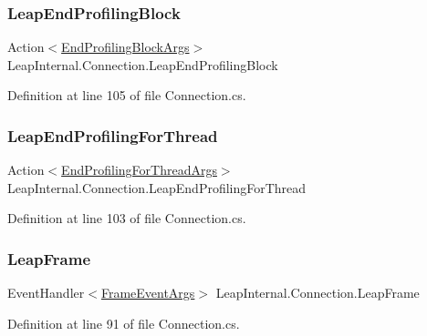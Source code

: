 \subsubsection{\texorpdfstring{LeapEndProfilingBlock}{LeapEndProfilingBlock}}
{\footnotesize\ttfamily Action$<$\mbox{\hyperlink{struct_leap_1_1_end_profiling_block_args}{End\+Profiling\+Block\+Args}}$>$ Leap\+Internal.\+Connection.\+Leap\+End\+Profiling\+Block}



Definition at line 105 of file Connection.\+cs.

\mbox{\label{class_leap_internal_1_1_connection_a424896b5a35580707284fa570e40138a}} 
\subsubsection{\texorpdfstring{LeapEndProfilingForThread}{LeapEndProfilingForThread}}
{\footnotesize\ttfamily Action$<$\mbox{\hyperlink{struct_leap_1_1_end_profiling_for_thread_args}{End\+Profiling\+For\+Thread\+Args}}$>$ Leap\+Internal.\+Connection.\+Leap\+End\+Profiling\+For\+Thread}



Definition at line 103 of file Connection.\+cs.

\mbox{\label{class_leap_internal_1_1_connection_a66f84d7e27d1f9a33028ea0abbc89e6c}} 
\subsubsection{\texorpdfstring{LeapFrame}{LeapFrame}}
{\footnotesize\ttfamily Event\+Handler$<$\mbox{\hyperlink{class_leap_1_1_frame_event_args}{Frame\+Event\+Args}}$>$ Leap\+Internal.\+Connection.\+Leap\+Frame}



Definition at line 91 of file Connection.\+cs.

\mbox{\label{class_leap_internal_1_1_connection_ae8fb7ce09bced652e319aada4a8e3755}} 
